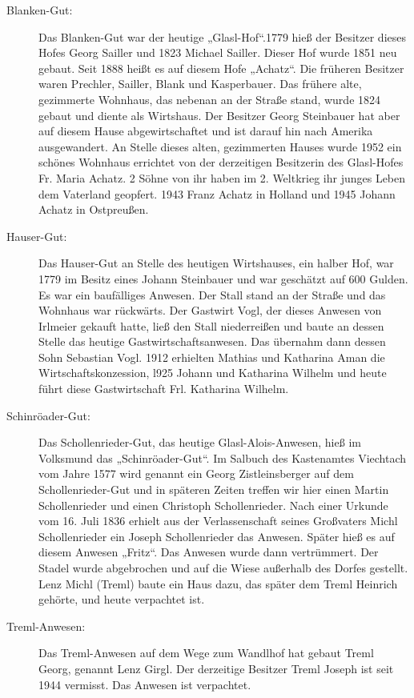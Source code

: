 \documentclass[12pt,a4pager]{book}
\begin{document}
\begin{description}
\item[Blanken-Gut:] Das Blanken-Gut war der heutige „Glasl-Hof“.1779 hieß der
Besitzer dieses Hofes Georg Sailler und 1823 Michael Sailler. Dieser Hof wurde
1851 neu gebaut. Seit 1888 heißt es auf diesem Hofe „Achatz“. Die früheren
Besitzer waren Prechler, Sailler, Blank und Kasperbauer. Das frühere alte,
gezimmerte Wohnhaus, das nebenan an der Straße stand, wurde 1824 gebaut und
diente als Wirtshaus. Der Besitzer Georg Steinbauer hat aber auf diesem Hause
abgewirtschaftet und ist darauf hin nach Amerika ausgewandert. An Stelle dieses
alten, gezimmerten Hauses wurde 1952 ein schönes Wohnhaus errichtet von der
derzeitigen Besitzerin des Glasl-Hofes Fr. Maria Achatz. 2 Söhne von ihr haben
im 2. Weltkrieg ihr junges Leben dem Vaterland geopfert. 1943 Franz Achatz in
Holland und 1945 Johann Achatz in Ostpreußen.

\item[Hauser-Gut:] Das Hauser-Gut an Stelle des heutigen Wirtshauses, ein halber
Hof, war 1779 im Besitz eines Johann Steinbauer und war geschätzt auf 600
Gulden. Es war ein baufälliges Anwesen. Der Stall stand an der Straße und das
Wohnhaus war rückwärts. Der Gastwirt Vogl, der dieses Anwesen von Irlmeier
gekauft hatte, ließ den Stall niederreißen und baute an dessen Stelle das
heutige Gastwirtschaftsanwesen. Das übernahm dann dessen Sohn Sebastian Vogl.
1912 erhielten Mathias und Katharina Aman die Wirtschaftskonzession, l925 Johann
und Katharina Wilhelm und heute führt diese Gastwirtschaft Frl. Katharina
Wilhelm.

\item[Schinröader-Gut:] Das Schollenrieder-Gut, das heutige Glasl-Alois-Anwesen,
hieß im Volksmund das „Schinröader-Gut“. Im Salbuch des Kastenamtes Viechtach
vom Jahre 1577 wird genannt ein Georg Zistleinsberger auf dem Schollenrieder-Gut
und in späteren Zeiten treffen wir hier einen Martin Schollenrieder und einen
Christoph Schollenrieder. Nach einer Urkunde vom 16. Juli 1836 erhielt aus der
Verlassenschaft seines Großvaters Michl Schollenrieder ein Joseph Schollenrieder
das Anwesen. Später hieß es auf diesem Anwesen „Fritz“. Das Anwesen wurde dann
vertrümmert. Der Stadel wurde abgebrochen und auf die Wiese außerhalb des Dorfes
gestellt. Lenz Michl (Treml) baute ein Haus dazu, das später dem Treml Heinrich
gehörte, und heute verpachtet ist.

\item[Treml-Anwesen:] Das Treml-Anwesen auf dem Wege zum Wandlhof hat gebaut
Treml Georg, genannt Lenz Girgl. Der derzeitige Besitzer Treml Joseph ist seit
1944 vermisst. Das Anwesen ist verpachtet.


\end{description}
\end{document}
